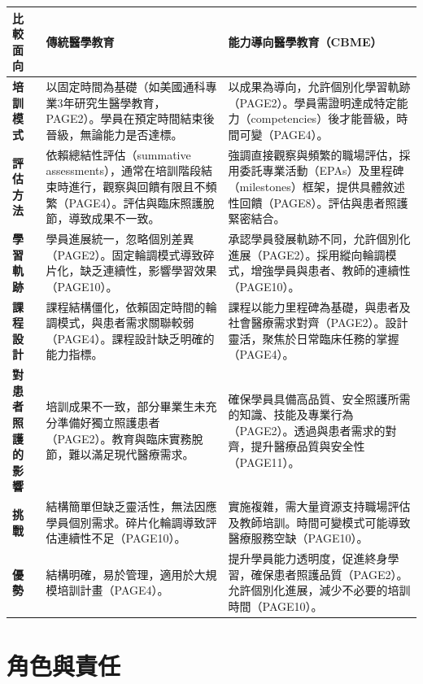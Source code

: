 \documentclass[12pt,a4paper]{article}
\begin{document}
\begin{longtable}{p{4cm}|p{6cm}|p{6cm}}
    \toprule
    \textbf{比較面向} & \textbf{傳統醫學教育} & \textbf{能力導向醫學教育（CBME）} \\
    \midrule
    \endhead
    \textbf{培訓模式} & 
    以固定時間為基礎（如美國通科專業3年研究生醫學教育，PAGE2）。學員在預定時間結束後晉級，無論能力是否達標。 & 
    以成果為導向，允許個別化學習軌跡（PAGE2）。學員需證明達成特定能力（competencies）後才能晉級，時間可變（PAGE4）。 \\
    \midrule
    \textbf{評估方法} & 
    依賴總結性評估（summative assessments），通常在培訓階段結束時進行，觀察與回饋有限且不頻繁（PAGE4）。評估與臨床照護脫節，導致成果不一致。 & 
    強調直接觀察與頻繁的職場評估，採用委託專業活動（EPAs）及里程碑（milestones）框架，提供具體敘述性回饋（PAGE8）。評估與患者照護緊密結合。 \\
    \midrule
    \textbf{學習軌跡} & 
    學員進展統一，忽略個別差異（PAGE2）。固定輪調模式導致碎片化，缺乏連續性，影響學習效果（PAGE10）。 & 
    承認學員發展軌跡不同，允許個別化進展（PAGE2）。採用縱向輪調模式，增強學員與患者、教師的連續性（PAGE10）。 \\
    \midrule
    \textbf{課程設計} & 
    課程結構僵化，依賴固定時間的輪調模式，與患者需求關聯較弱（PAGE4）。課程設計缺乏明確的能力指標。 & 
    課程以能力里程碑為基礎，與患者及社會醫療需求對齊（PAGE2）。設計靈活，聚焦於日常臨床任務的掌握（PAGE4）。 \\
    \midrule
    \textbf{對患者照護的影響} & 
    培訓成果不一致，部分畢業生未充分準備好獨立照護患者（PAGE2）。教育與臨床實務脫節，難以滿足現代醫療需求。 & 
    確保學員具備高品質、安全照護所需的知識、技能及專業行為（PAGE2）。透過與患者需求的對齊，提升醫療品質與安全性（PAGE11）。 \\
    \midrule
    \textbf{挑戰} & 
    結構簡單但缺乏靈活性，無法因應學員個別需求。碎片化輪調導致評估連續性不足（PAGE10）。 & 
    實施複雜，需大量資源支持職場評估及教師培訓。時間可變模式可能導致醫療服務空缺（PAGE10）。 \\
    \midrule
    \textbf{優勢} & 
    結構明確，易於管理，適用於大規模培訓計畫（PAGE4）。 & 
    提升學員能力透明度，促進終身學習，確保患者照護品質（PAGE2）。允許個別化進展，減少不必要的培訓時間（PAGE10）。 \\
    \bottomrule
\end{longtable}
\section{角色與責任}
\end{document}
